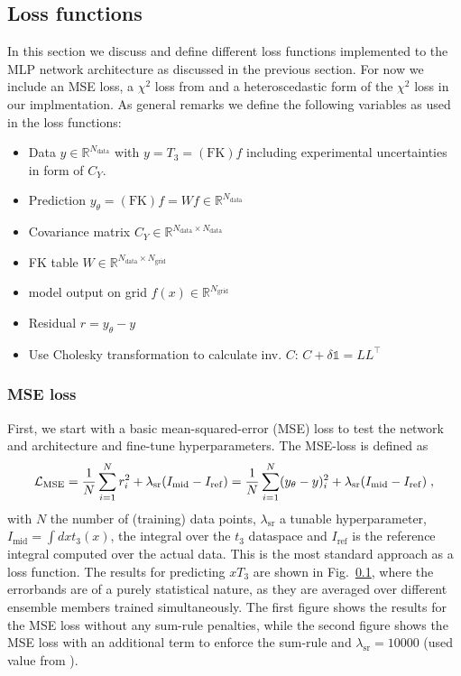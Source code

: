 \documentclass[11pt,a4paper]{article}
\begin{document}
\subsection{Loss functions}
In this section we discuss and define different loss functions implemented to the MLP network architecture as discussed in the previous section. For now we include an MSE loss, a $\chi^2$ loss from  and a heteroscedastic form of the $\chi^2$ loss in our implmentation.
As general remarks we define the following variables as used in the loss functions:
%
\begin{itemize} %
    \item Data $y \in \mathbb{R}^{N_\mathrm{data}}$ with $y = T_3 = \mathrm{(FK)} f$ including experimental uncertainties in form of $C_Y$.
    \item Prediction $y_\theta = \mathrm{(FK)} f = Wf \in \mathbb{R}^{N_\mathrm{data}}$
    \item Covariance matrix $C_Y \in \mathbb{R}^{N_\mathrm{data} \times N_\mathrm{data}}$
    \item FK table $W \in \mathbb{R}^{N_\mathrm{data} \times N_\mathrm{grid}}$ 
    \item model output on grid $f(x) \in \mathbb{R}^{N_\mathrm{grid}}$
    \item Residual $r = y_\theta - y$
    \item Use Cholesky transformation to calculate inv. $C$: $C+\delta \mathds{1} = LL^\top$
\end{itemize}
\subsubsection*{MSE loss}

First, we start with a basic mean-squared-error (MSE) loss to test the network and architecture and fine-tune hyperparameters. 
The MSE-loss is defined as 
%
\begin{align}
    \mathcal{L}_\mathrm{MSE} = \frac{1}{N} \sum_{i=1}^N r_i^2 + \lambda_\mathrm{sr} (I_\mathrm{mid} - I_\mathrm{ref}) = \frac{1}{N}\sum_{i=1}^N (y_{\theta} - y)_i^2 + \lambda_\mathrm{sr} (I_\mathrm{mid} - I_\mathrm{ref}) \; ,
\end{align}
%
with $N$ the number of (training) data points, $\lambda_\mathrm{sr}$ a tunable hyperparameter, $I_\mathrm{mid}=\int dx t_3(x)$, the integral over the $t_3$ dataspace and $I_\mathrm{ref}$ is the reference integral computed over the actual data.
This is the most standard approach as a loss function. The results for predicting $xT_3$ are shown in Fig.~\ref{}, where the errorbands are of a purely statistical nature, as they are averaged over different ensemble members trained simultaneously. 
The first figure shows the results for the MSE loss without any sum-rule penalties, while the second figure shows the MSE loss with an additional term to enforce the sum-rule and $\lambda_\mathrm{sr}=10000$ (used value from ).
\end{document}

